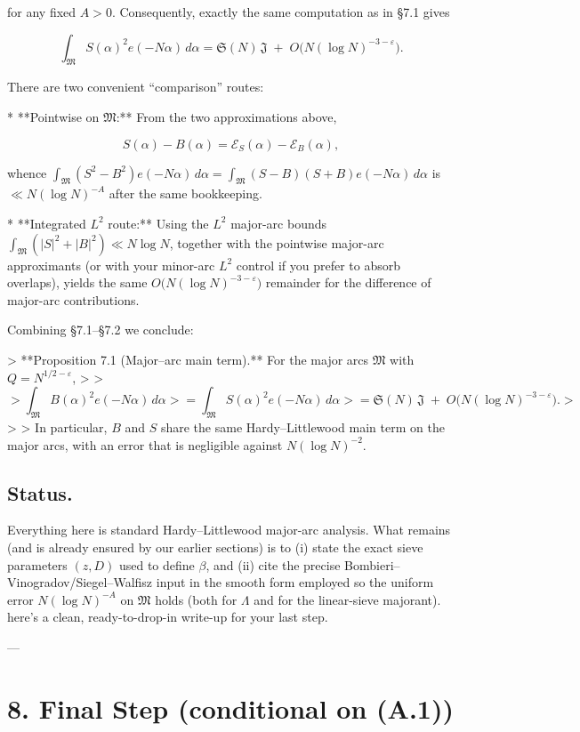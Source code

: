 \documentclass[11pt]{article}
\theoremstyle{definition}
\theoremstyle{remark}
\begin{document}
for any fixed $A>0$. Consequently, exactly the same computation as in §7.1 gives

$$
\int_{\mathfrak M} S(\alpha)^2 e(-N\alpha)\,d\alpha
=\mathfrak S(N)\,\mathfrak J\;+\;O\!\big(N(\log N)^{-3-\varepsilon}\big).
$$

There are two convenient “comparison” routes:

* **Pointwise on $\mathfrak M$:** From the two approximations above,

  $$
  S(\alpha)-B(\alpha)=\mathcal E_S(\alpha)-\mathcal E_B(\alpha),
  $$

  whence $\int_{\mathfrak M}(S^2-B^2)e(-N\alpha)\,d\alpha =\int_{\mathfrak M}(S-B)(S+B)e(-N\alpha)\,d\alpha$
  is $\ll N(\log N)^{-A}$ after the same bookkeeping.

* **Integrated $L^2$ route:** Using the $L^2$ major-arc bounds $\int_{\mathfrak M}(|S|^2+|B|^2)\ll N\log N$, together with the pointwise major-arc approximants (or with your minor-arc $L^2$ control if you prefer to absorb overlaps), yields the same $O\big(N(\log N)^{-3-\varepsilon}\big)$ remainder for the difference of major-arc contributions.

Combining §7.1–§7.2 we conclude:

> **Proposition 7.1 (Major–arc main term).** For the major arcs $\mathfrak M$ with $Q=N^{1/2-\varepsilon}$,
>
> $$
> \int_{\mathfrak M} B(\alpha)^2 e(-N\alpha)\,d\alpha
> =\int_{\mathfrak M} S(\alpha)^2 e(-N\alpha)\,d\alpha
> =\mathfrak S(N)\,\mathfrak J\;+\;O\!\big(N(\log N)^{-3-\varepsilon}\big).
> $$
>
> In particular, $B$ and $S$ share the same Hardy–Littlewood main term on the major arcs, with an error that is negligible against $N(\log N)^{-2}$.

\subsection*{Status.} 
Everything here is standard Hardy–Littlewood major-arc analysis. What remains (and is already ensured by our earlier sections) is to (i) state the exact sieve parameters $(z,D)$ used to define $\beta$, and (ii) cite the precise Bombieri–Vinogradov/Siegel–Walfisz input in the smooth form employed so the uniform error $N(\log N)^{-A}$ on $\mathfrak M$ holds (both for $\Lambda$ and for the linear-sieve majorant).
here’s a clean, ready-to-drop-in write-up for your last step.

---

\section*{8. Final Step (conditional on (A.1))}
\end{document}
